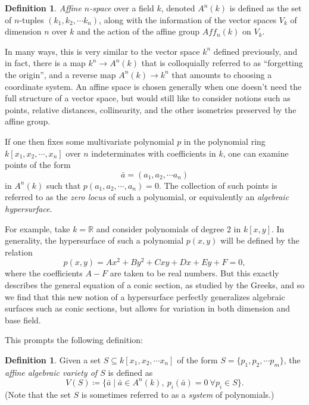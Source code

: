 \documentclass{article}
\theoremstyle{definition}
\newtheorem{definition}[theorem]{Definition} %
\newcommand{\RR}{\mathbb{R}}
\newcommand{\definedas}[0]{\coloneqq}
\newcommand{\theset}[1]{\{ #1 \}}
\begin{document}
\begin{definition}
\emph{Affine \(n\)-space} over a field \(k\), denoted
\(A^n(k)\) is defined as the set of \(n\)-tuples
\((k_1, k_2, \cdots k_n)\), along with the information of the vector
spaces \(V_k\) of dimension \(n\) over \(k\) and the action of the
affine group \(Aff_n(k)\) on \(V_k\).
\end{definition}

In many ways, this is very similar to the vector space \(k^n\) defined
previously, and in fact, there is a map \(k^n \rightarrow A^n(k)\) that
is colloquially referred to as ``forgetting the origin'', and a reverse
map \(A^n(k) \rightarrow k^n\) that amounts to choosing a coordinate
system. An affine space is chosen generally when one doesn't need the
full structure of a vector space, but would still like to consider
notions such as points, relative distances, collinearity, and the other
isometries preserved by the affine group.

If one then fixes some multivariate polynomial \(p\) in the polynomial ring
\(k[x_1, x_2, \cdots, x_n]\) over \(n\) indeterminates with coefficients
in \(k\), one can examine points of the form
\[\bar{a} = (a_1, a_2, \cdots a_n)\] in \(A^n(k)\) such that
\(p(a_1, a_2, \cdots, a_n) = 0\). The collection of such points is
referred to as the \emph{zero locus} of such a polynomial, or
equivalently an \emph{algebraic hypersurface}.

For example, take \(k=\RR\) and consider polynomials of degree 2 in
\(k[x,y]\). In generality, the hypersurface of such a polynomial
\(p(x,y)\) will be defined by the relation
\[p(x,y) = Ax^2 + By^2 + Cxy + Dx + Ey + F = 0,\] where the coefficients
\(A-F\) are taken to be real numbers. But this exactly describes the
general equation of a conic section, as studied by the Greeks, and so we
find that this new notion of a hypersurface perfectly generalizes
algebraic surfaces such as conic sections, but allows for variation in
both dimension and base field.

This prompts the following definition:

\begin{definition}
Given a set \(S\subseteq k[x_1, x_2, \cdots x_n]\) of the
form \(S = \theset{p_1, p_2, \cdots p_m}\), the \emph{affine algebraic
variety of \(S\)} is defined as
\[V(S) \definedas \theset{\bar{a} \mid \bar{a} \in A^n(k), ~ p_i(\bar{a}) = 0~ \forall p_i \in S}.\]
(Note that the set \(S\) is sometimes referred to as a \emph{system} of
polynomials.)
\end{definition}
\end{document}

